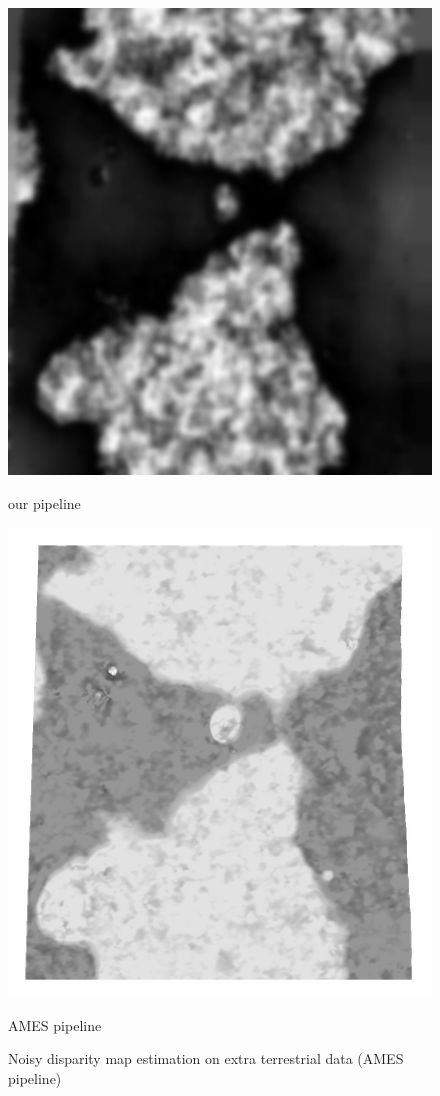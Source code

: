 \documentclass[10pt,twocolumn,letterpaper]{article}
\begin{document}
\begin{figure}
    \centering
    \begin{minipage}[t]{0.22\textwidth}
    \centerline{\includegraphics[width=\textwidth]{out_moon.png}}
    \centerline{our pipeline}
    \end{minipage}
    \hfill
    \begin{minipage}[t]{0.23\textwidth}   
    \centerline{\includegraphics[width=\textwidth]{out_moon_gt.jpeg}}
    \centerline{AMES pipeline}
    \end{minipage}
    \caption{Noisy disparity map estimation on extra terrestrial data (AMES pipeline)}
    \label{fig:moon_out}
\end{figure}
\end{document}
